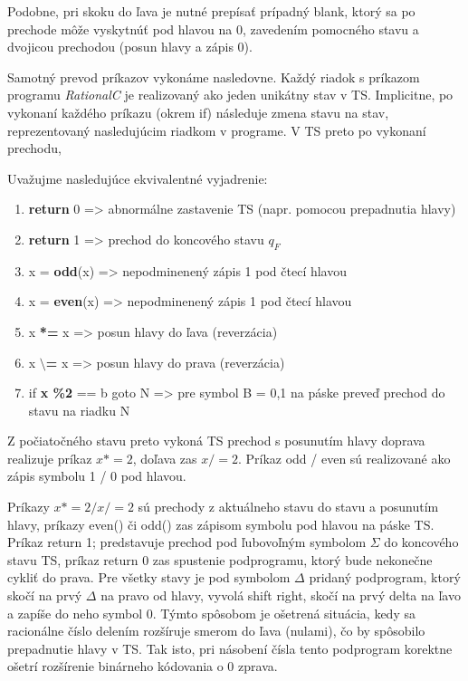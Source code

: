 \documentclass[10pt]{article}
\begin{document}
Podobne, pri skoku do ľava je nutné prepísať prípadný blank, ktorý sa po prechode môže vyskytnúť pod
hlavou na 0, zavedením pomocného stavu a dvojicou prechodou (posun hlavy a zápis 0).

Samotný prevod príkazov vykonáme nasledovne. Každý riadok s príkazom programu \textit{RationalC} je realizovaný ako jeden unikátny stav v TS.
Implicitne, po vykonaní každého príkazu (okrem if) následuje zmena stavu na stav, reprezentovaný
nasledujúcim riadkom v programe. V TS preto po vykonaní prechodu,  

Uvažujme nasledujúce ekvivalentné vyjadrenie:
\begin{enumerate}
    \item \textbf{return} 0 => abnormálne zastavenie TS (napr. pomocou prepadnutia hlavy)
    \item \textbf{return} 1 => prechod do koncového stavu $q_F$
    \item x = \textbf{odd}(x) => nepodminenený zápis 1 pod čtecí hlavou
    \item x = \textbf{even}(x) => nepodminenený zápis 1 pod čtecí hlavou
    \item x \textbf{*=} x => posun hlavy do ľava (reverzácia)
    \item x \textbf{$\setminus$=} x => posun hlavy do prava (reverzácia)
    \item if \textbf{x \%2} == b goto N => pre symbol B = {0,1} na páske preveď prechod do stavu na riadku N
\end{enumerate}

Z počiatočného stavu preto vykoná TS prechod s posunutím hlavy doprava realizuje príkaz $x *= 2$, doľava zas $x /= 2$. Príkaz odd /
even sú realizované ako zápis symbolu 1 / 0 pod hlavou.

Príkazy $x *= 2 / x /= 2$ sú prechody z aktuálneho stavu do stavu a posunutím hlavy,
príkazy even() či odd() zas zápisom symbolu pod hlavou na páske TS.
Príkaz return 1; predstavuje prechod pod ľubovoľným symbolom $\Sigma$ do koncového stavu TS,
príkaz return 0 zas spustenie podprogramu, ktorý bude nekonečne cykliť do prava.
Pre všetky stavy je pod symbolom $\Delta$ pridaný podprogram, ktorý skočí na prvý $\Delta$ na pravo od
hlavy, vyvolá shift right, skočí na prvý delta na ľavo a zapíše do neho symbol 0.
Týmto spôsobom je ošetrená situácia, kedy sa racionálne číslo delením rozšíruje smerom do ľava
(nulami), čo by spôsobilo prepadnutie hlavy v TS. 
Tak isto, pri násobení čísla tento podprogram korektne ošetrí rozšírenie binárneho kódovania o 0
zprava.
\end{document}
